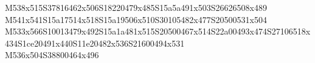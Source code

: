 \documentclass{article}
\begin{document}
\begin{multicols}{5}
\begin{center}
M538x515S37816462x506S18220479x485S15a5a491x503S26626508x489 %
\\M541x541S15a17514x518S15a19506x510S30105482x477S20500531x504 %
\\M533x566S10013479x492S15a1a481x515S20500467x514S22a00493x474S27106518x434S1ce20491x440S11e20482x536S21600494x531 %
\\M536x504S38800464x496 %

\end{center}
\end{multicols}
\end{document}
